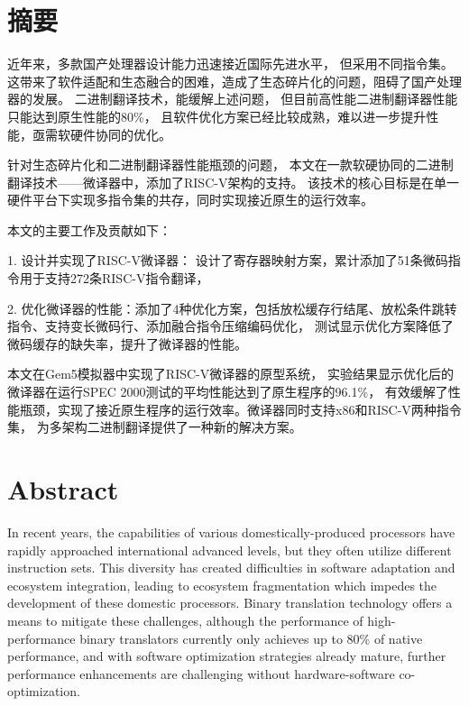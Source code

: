 \maketitle%
\MAKETITLE%
\makedeclaration%
\intobmk\chapter*{摘\quad 要}%
\setcounter{page}{1}%
近年来，多款国产处理器设计能力迅速接近国际先进水平，
但采用不同指令集。
这带来了软件适配和生态融合的困难，造成了生态碎片化的问题，阻碍了国产处理器的发展。
二进制翻译技术，能缓解上述问题，
但目前高性能二进制翻译器性能只能达到原生性能的80\%，
且软件优化方案已经比较成熟，难以进一步提升性能，亟需软硬件协同的优化。

针对生态碎片化和二进制翻译器性能瓶颈的问题，
本文在一款软硬协同的二进制翻译技术——微译器中，添加了RISC-V架构的支持。
该技术的核心目标是在单一硬件平台下实现多指令集的共存，同时实现接近原生的运行效率。

本文的主要工作及贡献如下：

1. 设计并实现了RISC-V微译器：
设计了寄存器映射方案，累计添加了51条微码指令用于支持272条RISC-V指令翻译，

2. 优化微译器的性能：添加了4种优化方案，包括放松缓存行结尾、放松条件跳转指令、支持变长微码行、添加融合指令压缩编码优化，
测试显示优化方案降低了微码缓存的缺失率，提升了微译器的性能。

本文在Gem5模拟器中实现了RISC-V微译器的原型系统，
实验结果显示优化后的微译器在运行SPEC 2000测试的平均性能达到了原生程序的96.1\%，
有效缓解了性能瓶颈，实现了接近原生程序的运行效率。微译器同时支持x86和RISC-V两种指令集，
为多架构二进制翻译提供了一种新的解决方案。

\intobmk\chapter*{Abstract}%

In recent years, the capabilities of various domestically-produced processors have rapidly approached international advanced levels, but they often utilize different instruction sets. This diversity has created difficulties in software adaptation and ecosystem integration, leading to ecosystem fragmentation which impedes the development of these domestic processors. Binary translation technology offers a means to mitigate these challenges, although the performance of high-performance binary translators currently only achieves up to 80\% of native performance, and with software optimization strategies already mature, further performance enhancements are challenging without hardware-software co-optimization.

